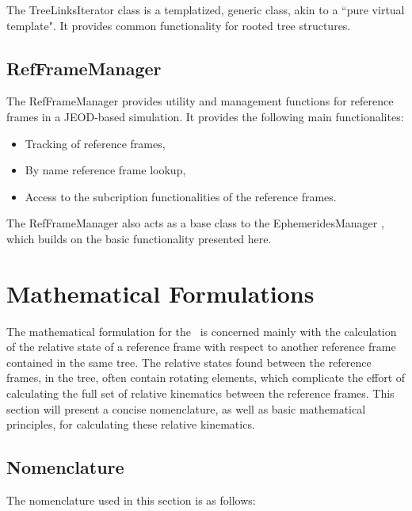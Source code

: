 The TreeLinksIterator class is a templatized, generic class, akin to a
``pure virtual template". It provides common functionality for rooted tree
structures.

\subsection{RefFrameManager}

The RefFrameManager provides utility and management functions for reference
frames in a JEOD-based simulation. It provides the following main functionalites:

\begin{itemize}
\item{Tracking of reference frames},
\item{By name reference frame lookup},
\item{Access to the subcription functionalities of the reference frames}.
\end{itemize}

The RefFrameManager also acts as a base class to the EphemeridesManager
\cite{dynenv:EPHEMERIDES}, which builds on the basic functionality presented here.

\section{Mathematical Formulations}

The mathematical formulation for the \ is concerned mainly
with the calculation of the relative state of a reference frame with respect
to another reference frame contained in the same tree. The relative states
found between the reference frames, in the tree, often contain rotating
elements, which complicate the effort of calculating the full set of
relative kinematics between the reference frames. This section will present
a concise nomenclature, as well as basic mathematical principles, for
calculating these relative kinematics.

\subsection{Nomenclature}

The nomenclature used in this section is as follows:

